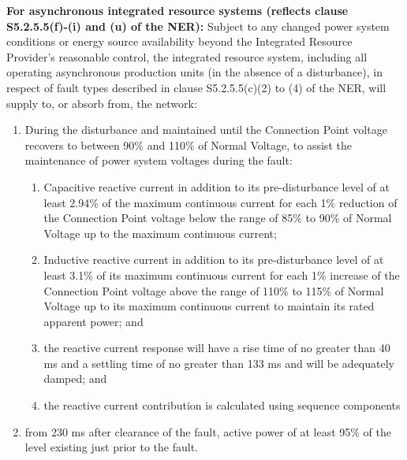 \textbf{For asynchronous integrated resource systems (reflects clause S5.2.5.5(f)-(i) and (u) of the NER):}  
Subject to any changed power system conditions or energy source availability beyond the Integrated Resource Provider's reasonable control, the integrated resource system, including all operating asynchronous production units (in the absence of a disturbance), in respect of fault types described in clause S5.2.5.5(c)(2) to (4) of the NER, will supply to, or absorb from, the network:

\begin{enumerate}
	\item During the disturbance and maintained until the Connection Point voltage recovers to between 90\% and 110\% of Normal Voltage, to assist the maintenance of power system voltages during the fault:
	\begin{enumerate}
		\item Capacitive reactive current in addition to its pre-disturbance level of at least 2.94\% of the maximum continuous current for each 1\% reduction of the Connection Point voltage below the range of  85\% to 90\% of Normal Voltage up to the maximum continuous current; 
		\item Inductive reactive current in addition to its pre-disturbance level of at least 3.1\% of its maximum continuous current for each 1\% increase of the Connection Point voltage above the range of 110\% to 115\% of Normal Voltage up to its maximum continuous current to maintain its rated apparent power; and

		\item the reactive current response will have a rise time of no greater than 40 ms and a settling time of no greater than 133 ms and will be adequately damped; and
		\item the reactive current contribution is calculated using sequence components
	\end{enumerate}
	\item from 230 ms after clearance of the fault, active power of at least 95\% of the level existing just prior to the fault. 
\end{enumerate}
